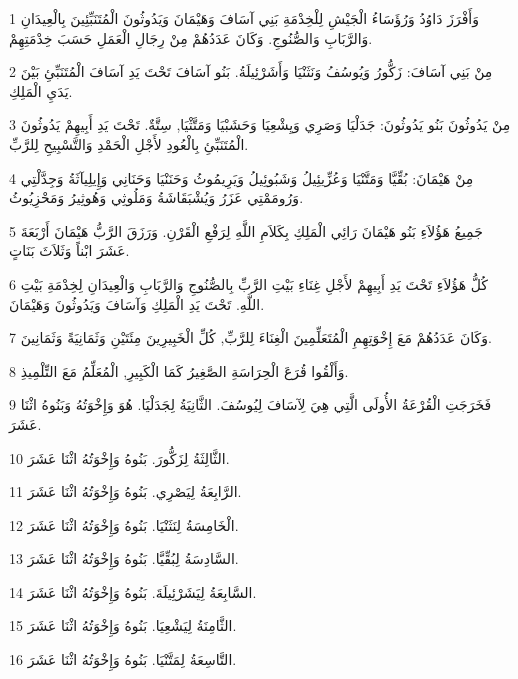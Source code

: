 \par 1 وَأَفْرَزَ دَاوُدُ وَرُؤَسَاءُ الْجَيْشِ لِلْخِدْمَةِ بَنِي آسَافَ وَهَيْمَانَ وَيَدُوثُونَ الْمُتَنَبِّئِينَ بِالْعِيدَانِ وَالرَّبَابِ وَالصُّنُوجِ. وَكَانَ عَدَدُهُمْ مِنْ رِجَالِ الْعَمَلِ حَسَبَ خِدْمَتِهِمْ.
\par 2 مِنْ بَنِي آسَافَ: زَكُّورُ وَيُوسُفُ وَنَثَنْيَا وَأَشَرْئِيلَةُ. بَنُو آسَافَ تَحْتَ يَدِ آسَافَ الْمُتَنَبِّئِ بَيْنَ يَدَيِ الْمَلِكِ.
\par 3 مِنْ يَدُوثُونَ بَنُو يَدُوثُونَ: جَدَلْيَا وَصَرِي وَيِشْعِيَا وَحَشَبْيَا وَمَتَّثْيَا, سِتَّةٌ. تَحْتَ يَدِ أَبِيهِمْ يَدُوثُونَ الْمُتَنَبِّئِ بِالْعُودِ لأَجْلِ الْحَمْدِ وَالتَّسْبِيحِ لِلرَّبِّ.
\par 4 مِنْ هَيْمَانَ: بُقِّيَّا وَمَتَّنْيَا وَعُزِّيئِيلُ وَشَبُوئِيلُ وَيَرِيمُوثُ وَحَنَنْيَا وَحَنَانِي وَإِيلِيآثَةُ وَجِدَّلْتِي وَرُومَمْتِي عَزَرُ وَيُشْبَقَاشَةُ وَمَلُوثِي وَهُوثِيرُ وَمَحْزِيُوثُ.
\par 5 جَمِيعُ هَؤُلاَءِ بَنُو هَيْمَانَ رَائِي الْمَلِكِ بِكَلاَمِ اللَّهِ لِرَفْعِ الْقَرْنِ. وَرَزَقَ الرَّبُّ هَيْمَانَ أَرْبَعَةَ عَشَرَ ابْناً وَثَلاَثَ بَنَاتٍ.
\par 6 كُلُّ هَؤُلاَءِ تَحْتَ يَدِ أَبِيهِمْ لأَجْلِ غِنَاءِ بَيْتِ الرَّبِّ بِالصُّنُوجِ وَالرَّبَابِ وَالْعِيدَانِ لِخِدْمَةِ بَيْتِ اللَّهِ. تَحْتَ يَدِ الْمَلِكِ وَآسَافَ وَيَدُوثُونَ وَهَيْمَانَ.
\par 7 وَكَانَ عَدَدُهُمْ مَعَ إِخْوَتِهِمِ الْمُتَعَلِّمِينَ الْغِنَاءَ لِلرَّبِّ, كُلِّ الْخَبِيرِينَ مِئَتَيْنِ وَثَمَانِيَةً وَثَمَانِينَ.
\par 8 وَأَلْقُوا قُرَعَ الْحِرَاسَةِ الصَّغِيرُ كَمَا الْكَبِيرِ, الْمُعَلِّمُ مَعَ التِّلْمِيذِ.
\par 9 فَخَرَجَتِ الْقُرْعَةُ الأُولَى الَّتِي هِيَ لِآسَافَ لِيُوسُفَ. الثَّانِيَةُ لِجَدَلْيَا. هُوَ وَإِخْوَتُهُ وَبَنُوهُ اثْنَا عَشَرَ.
\par 10 الثَّالِثَةُ لِزَكُّورَ. بَنُوهُ وَإِخْوَتُهُ اثْنَا عَشَرَ.
\par 11 الرَّابِعَةُ لِيَصْرِي. بَنُوهُ وَإِخْوَتُهُ اثْنَا عَشَرَ.
\par 12 الْخَامِسَةُ لِنَثَنْيَا. بَنُوهُ وَإِخْوَتُهُ اثْنَا عَشَرَ.
\par 13 السَّادِسَةُ لِبُقِّيَّا. بَنُوهُ وَإِخْوَتُهُ اثْنَا عَشَرَ.
\par 14 السَّابِعَةُ لِيَشَرْئِيلَةَ. بَنُوهُ وَإِخْوَتُهُ اثْنَا عَشَرَ.
\par 15 الثَّامِنَةُ لِيَشْعِيَا. بَنُوهُ وَإِخْوَتُهُ اثْنَا عَشَرَ.
\par 16 التَّاسِعَةُ لِمَتَّنْيَا. بَنُوهُ وَإِخْوَتُهُ اثْنَا عَشَرَ.
